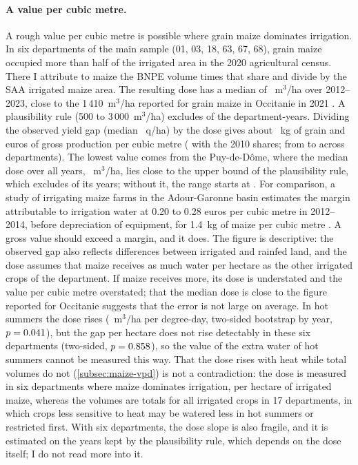 \paragraph{A value per cubic metre.} A rough value per cubic metre is possible where grain maize dominates irrigation. In six departments of the main sample (01, 03, 18, 63, 67, 68), grain maize occupied more than half of the irrigated area in the 2020 agricultural census. There I attribute to maize the BNPE volume times that share and divide by the SAA irrigated maize area. The resulting dose has a median of \WatDose~m$^3$/ha over 2012--2023, close to the 1\,410~m$^3$/ha reported for grain maize in Occitanie in 2021 \parencite{agreste2026occitanie}. A plausibility rule (500 to 3\,000~m$^3$/ha) excludes \WatExcl{} of the \WatN{} department-years. Dividing the observed yield gap (median \WatGain~q/ha) by the dose gives about \WatKg~kg of grain and \WatEur{} euros of gross production per cubic metre (\WatEurTen{} with the 2010 shares; from \WatEurMin{} to \WatEurMax{} across departments). The lowest value comes from the Puy-de-Dôme, where the median dose over all years, \WatLowDepDose~m$^3$/ha, lies close to the upper bound of the plausibility rule, which excludes \WatLowDepExcl{} of its \WatLowDepYears{} years; without it, the range starts at \WatEurMinOther. For comparison, a study of irrigating maize farms in the Adour-Garonne basin estimates the margin attributable to irrigation water at 0.20 to 0.28 euros per cubic metre in 2012--2014, before depreciation of equipment, for 1.4~kg of maize per cubic metre \parencite{draaf2017}. A gross value should exceed a margin, and it does. The figure is descriptive: the observed gap also reflects differences between irrigated and rainfed land, and the dose assumes that maize receives as much water per hectare as the other irrigated crops of the department. If maize receives more, its dose is understated and the value per cubic metre overstated; that the median dose is close to the figure reported for Occitanie suggests that the error is not large on average. In hot summers the dose rises (\WatDoseSlope~m$^3$/ha per degree-day, two-sided bootstrap by year, $p = 0.041$), but the gap per hectare does not rise detectably in these six departments (two-sided, $p = 0.858$), so the value of the extra water of hot summers cannot be measured this way. That the dose rises with heat while total volumes do not (\cref{subsec:maize-vpd}) is not a contradiction: the dose is measured in six departments where maize dominates irrigation, per hectare of irrigated maize, whereas the volumes are totals for all irrigated crops in 17 departments, in which crops less sensitive to heat may be watered less in hot summers or restricted first. With six departments, the dose slope is also fragile, and it is estimated on the years kept by the plausibility rule, which depends on the dose itself; I do not read more into it.

